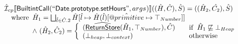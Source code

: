 \[\begin{array}{l}
\aI _{cp}\lbr \SF{BuiltintCall}(``\SF{Date.prototype.setHours}",args_{})\rbr((\hat{H},\hat{C}), \hat{S})
  = ((\hat{H}_2, \hat{C_2}), \hat{S})\\
\quad\wherec{
  \hat{H}_1 = \bigsqcup_{\hat{l} \in \hat{C}.2} \hat{H}[\hat{l}
    \mapsto \hat{H}(\hat{l})[\avarprop{primitive} \mapsto \top_{Number}]]\\
  \land\ (\hat{H}_2, \hat{C}_2) = 
    \left\{\begin{array}{l@{\quad\quad}l}
      (\ahf{ReturnStore}(\hat{H}_1, \top_{Number}), \hat{C})
      & \ifc{\hat{H}_1 \not\sqsubseteq \bot_{Heap}}\\
      (\bot_{heap}, \bot_{context}) & \owc \\
    \end{array}\right.\\
  }\\
\\\\

\end{array}
\]

